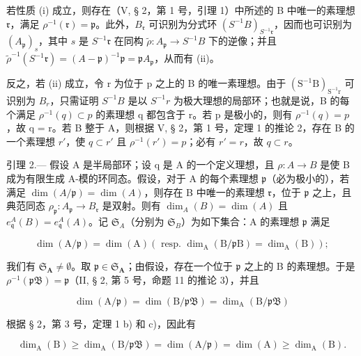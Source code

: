 若性质 (i) 成立，则存在（V, § 2，第 1 号，引理 1）中所述的 B 中唯一的素理想 \(\mathfrak{r}\)，满足 \(\rho^{-1}(\mathfrak{r}) = \mathfrak{p}\)。此外，\(B_{\mathfrak{r}}\) 可识别为分式环 \((S^{-1}B)_{S^{-1}\mathfrak{r}}\)，因而也可识别为 \((A_{\mathfrak{p}})_{s}\)，其中 \(s\) 是 \(S^{-1}\mathfrak{r}\) 在同构 \(\tilde{\rho}: A_{\mathfrak{p}} \to S^{-1}B\) 下的逆像；并且 \(\tilde{\rho}^{-1}(S^{-1}\mathfrak{r}) = (A - \mathfrak{p})^{-1}\mathfrak{p} = \mathfrak{p}A_{\mathfrak{p}}\)，从而有 (ii)。

反之，若 (ii) 成立，令 r 为位于 p 之上的 B 的唯一素理想。由于 \((\mathrm{S}^{-1}\mathrm{B})_{\mathrm{S}^{-1}\mathrm{r}}\) 可识别为 \(B_{r}\)，只需证明 \(S^{-1}B\) 是以 \(S^{-1}r\) 为极大理想的局部环；也就是说，B 的每个满足 \(\rho^{-1}(q) \subset p\) 的素理想 q 都包含于 r。若 p 是极小的，则有 \(\rho^{-1}(q) = p\)，故 q = r。若 B 整于 A，则根据 V, § 2，第 1 号，定理 1 的推论 2，存在 B 的一个素理想 \(r'\)，使 \(q \subset r'\) 且 \(\rho^{-1}(r') = p\)；必有 \(r' = r\)，故 \(q \subset r\)。

引理 2.--- 假设 A 是半局部环；设 q 是 A 的一个定义理想，且 \(\rho : A \to B\) 是使 B 成为有限生成 A-模的环同态。假设，对于 A 的每个素理想 \(\mathfrak{p}\)（必为极小的），若满足 \(\dim(A/\mathfrak{p}) = \dim(A)\)，则存在 B 中唯一的素理想 \(\mathfrak{r}\)，位于 \(\mathfrak{p}\) 之上，且典范同态 \(\rho_{\mathfrak{p}} : A_{\mathfrak{p}} \to B_{\mathfrak{r}}\) 是双射。则有 \(\dim_{A}(B) = \dim(A)\) 且 \(e_{\mathfrak{q}}^{A}(B) = e_{\mathfrak{q}}^{A}(A)\)。记 \(\mathfrak{S}_{A}\)（分别为 \(\mathfrak{S}_{B}\)）为如下集合：A 的素理想 \(\mathfrak{p}\) 满足

\[
\dim (\mathrm{A} / \mathfrak {p}) = \dim (\mathrm{A}) (\text { resp. } \dim_ {\mathrm{A}} (\mathrm{B} / \mathfrak {p} \mathrm{B}) = \dim_ {\mathrm{A}} (\mathrm{B}));
\]

我们有 \(\mathfrak{S}_{\mathbf{A}} \neq \emptyset\)。取 \(\mathfrak{p} \in \mathfrak{S}_{\mathbf{A}}\)；由假设，存在一个位于 \(\mathfrak{p}\) 之上的 B 的素理想。于是 \(\rho^{-1}(\mathfrak{pB}) = \mathfrak{p}\)（II, § 2, 第 5 号，命题 11 的推论 3），并且

\[
\dim (\mathrm{A} / \mathfrak {p}) = \dim (\mathrm{B} / \mathfrak {p B}) = \dim_ {\mathrm{A}} (\mathrm{B} / \mathfrak {p B})
\]

根据 § 2，第 3 号，定理 1 b) 和 c)，因此有

\[
\dim_ {\mathrm{A}} (\mathrm{B}) \geqslant \dim_ {\mathrm{A}} (\mathrm{B} / \mathfrak {p B}) = \dim (\mathrm{A} / \mathfrak {p}) = \dim (\mathrm{A}) \geqslant \dim_ {\mathrm{A}} (\mathrm{B}).
\]

